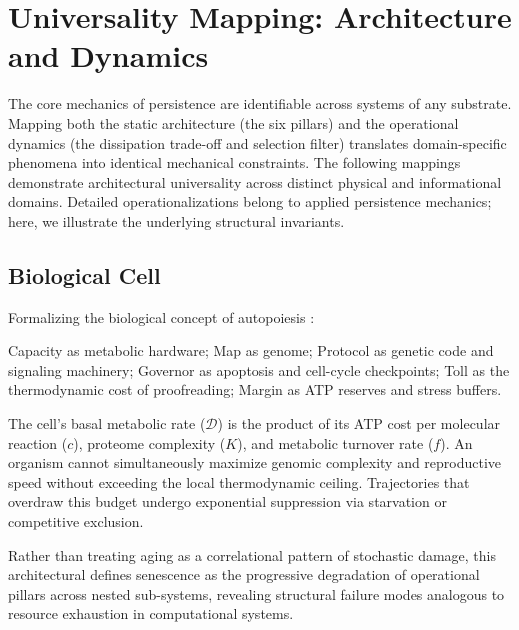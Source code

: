 \section{Universality Mapping: Architecture and Dynamics}
\label{sec:universality_mapping}

The core mechanics of persistence are identifiable across systems of any substrate. Mapping both the static architecture (the six pillars) and the operational dynamics (the dissipation trade-off and selection filter) translates domain-specific phenomena into identical mechanical constraints. The following mappings demonstrate architectural universality across distinct physical and informational domains. Detailed operationalizations belong to applied persistence mechanics; here, we illustrate the underlying structural invariants.

\subsection{Biological Cell}
Formalizing the biological concept of autopoiesis \cite{maturana_autopoiesis_1980}:
\begin{description}[leftmargin=0pt]
    \item[Architecture] Capacity as metabolic hardware; Map as genome; Protocol as genetic code and signaling machinery; Governor as apoptosis and cell-cycle checkpoints; Toll as the thermodynamic cost of proofreading; Margin as ATP reserves and stress buffers.
    \item[Dynamics] The cell's basal metabolic rate ($\mathcal{D}$) is the product of its ATP cost per molecular reaction ($c$), proteome complexity ($K$), and metabolic turnover rate ($f$). An organism cannot simultaneously maximize genomic complexity and reproductive speed without exceeding the local thermodynamic ceiling. Trajectories that overdraw this budget undergo exponential suppression via starvation or competitive exclusion.
    \item[Cross-Domain Transfer] Rather than treating aging as a correlational pattern of stochastic damage, this architectural defines senescence as the progressive degradation of operational pillars across nested sub-systems, revealing structural failure modes analogous to resource exhaustion in computational systems.
\end{description}

